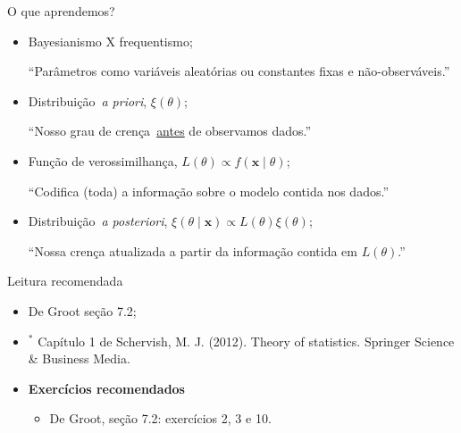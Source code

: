 \begin{frame}{O que aprendemos?}
\begin{itemize}
 \item[\faLightbulbO] Bayesianismo X frequentismo;
 
 ``Parâmetros como variáveis aleatórias ou constantes fixas e não-observáveis.''
 
 \item[\faHourglassStart] Distribuição~\textit{a priori}, $\xi(\theta)$;
 
 ``Nosso grau de crença~\underline{antes} de observamos dados.''
 
 \item[\faInfoCircle] Função de verossimilhança, $L(\theta) \propto f(\boldsymbol x \mid \theta)$;

 ``Codifica (toda) a informação sobre o modelo contida nos dados.''
 
 \item[\faHourglassEnd] Distribuição~\textit{a posteriori}, $\xi(\theta \mid \boldsymbol x) \propto L(\theta)\xi(\theta)$;
 
 ``Nossa crença atualizada a partir da informação contida em $L(\theta)$.''
 \end{itemize}
\end{frame}
\begin{frame}{Leitura recomendada}
\begin{itemize}
 \item[\faBook] De Groot seção 7.2;
 \item[\faBook] $^\ast$ Capítulo 1 de Schervish, M. J. (2012). Theory of statistics. Springer Science \& Business Media.
 \item {\large\textbf{Exercícios recomendados}}
 \begin{itemize}
  \item[\faBookmark] De Groot, seção 7.2: exercícios 2, 3 e 10. 
 \end{itemize}

\end{itemize} 
\end{frame}
